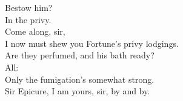 \documentclass[a4paper,oneside]{memoir}
\begin{document}
\begin{drama*}
Bestow him?\\
\dolspeaks {} In the privy.\\
\subtlespeaks {} Come along, sir,\\
I now must shew you Fortune's privy lodgings.\\
\facespeaks Are they perfumed, and his bath ready?\\
\subtlespeaks {} All:\\
Only the fumigation's somewhat strong.\\
\facespeaks {}
Sir Epicure, I am yours, sir, by and by.\\
\act

\scene


\end{drama*}
\end{document}
